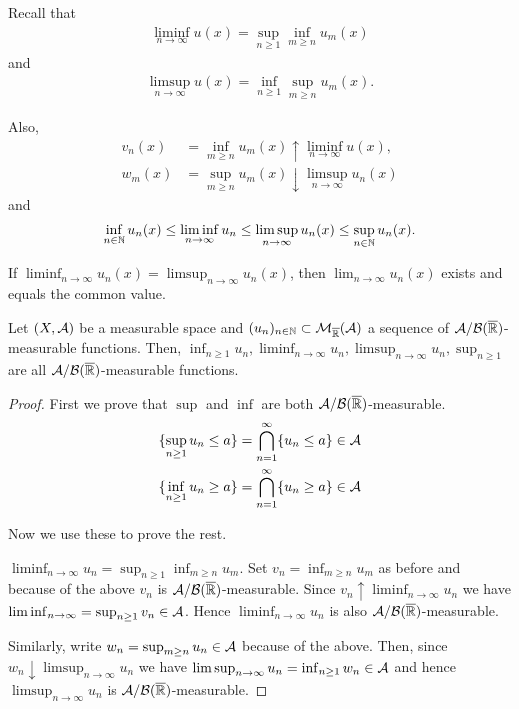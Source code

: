 Recall that
\begin{align}
	\liminf_{n\to \infty} u(x) = \sup_{n \geq 1} \inf_{m \geq n} u_m(x)
\end{align}
and
\begin{align}
	\limsup_{n\to\infty} u(x) = \inf_{n\geq 1}\sup_{m \geq n} u_m(x).
\end{align}

Also,
\begin{align*}
	v_n(x) &= \inf_{m \geq n} u_m(x) \uparrow \liminf_{n\to \infty} u(x),\\
	w_m(x) &= \sup_{m \geq n} u_m(x) \downarrow \limsup_{n\to\infty} u_n(x)
\end{align*}
and
\begin{align*}
	\inf_{n\in\mathbb{N}} u_n(x) \leq \liminf_{n\to\infty} u_n \leq \limsup_{n\to \infty} u_n(x) \leq \sup_{n\in\mathbb{N}} u_n(x).
\end{align*}


If $\liminf_{n\to \infty} u_n(x) = \limsup_{n\to \infty} u_n(x)$, then $\lim_{n\to \infty} u_n(x)$ exists and equals the common value.

\begin{cor}
	\label{cor:nasty-extended-measurable}
	Let $(X, \mathcal{A})$ be a measurable space and $(u_n)_{n\in\mathbb{N}} \subset \mathcal{M}_{{\overline{\mathbb{R}}}}(\mathcal{A})$ a sequence of $\mathcal{A}/\mathcal{B}({\overline{\mathbb{R}}})$-measurable functions. Then, $\inf_{n\geq 1} u_n, \liminf_{n\to \infty} u_n, \limsup_{n\to \infty} u_n, \sup_{n \geq 1}$ are all $\mathcal{A}/\mathcal{B}({\overline{\mathbb{R}}})$-measurable functions. 
\end{cor}

\begin{proof}
	First we prove that $\sup$ and $\inf$ are both $\mathcal{A}/\mathcal{B}({\overline{\mathbb{R}}})$-measurable.
	\begin{align*}
		\{\sup_{n \geq 1} u_n \leq a\} = \bigcap_{n=1}^\infty \{u_n \leq a\} \in \mathcal{A}\\
		\{\inf_{n \geq 1} u_n \geq a\} = \bigcap_{n=1}^\infty \{u_n \geq a\} \in \mathcal{A}
	\end{align*}
	
	Now we use these to prove the rest.
	
	$\liminf_{n\to \infty} u_n = \sup_{n \geq 1} \inf_{m \geq n} u_m$. Set $v_n = \inf_{m \geq n} u_m$ as before and because of the above $v_n$ is $\mathcal{A}/\mathcal{B}({\overline{\mathbb{R}}})$-measurable. Since $v_n \uparrow \liminf_{n\to \infty} u_n$ we have $\liminf_{n\to \infty} = \sup_{n \geq 1} v_n \in \mathcal{A}$. Hence $\liminf_{n\to \infty} u_n$ is also $\mathcal{A}/\mathcal{B}({\overline{\mathbb{R}}})$-measurable.
	
	Similarly, write $w_n = \sup_{m \geq n} u_n \in \mathcal{A}$ because of the above. Then, since $w_n \downarrow \limsup_{n\to\infty} u_n$ we have $\limsup_{n\to \infty} u_n = \inf_{n \geq 1} w_n \in \mathcal{A}$ and hence $\limsup_{n\to \infty} u_n$ is $\mathcal{A}/\mathcal{B}({\overline{\mathbb{R}}})$-measurable.
\end{proof}

